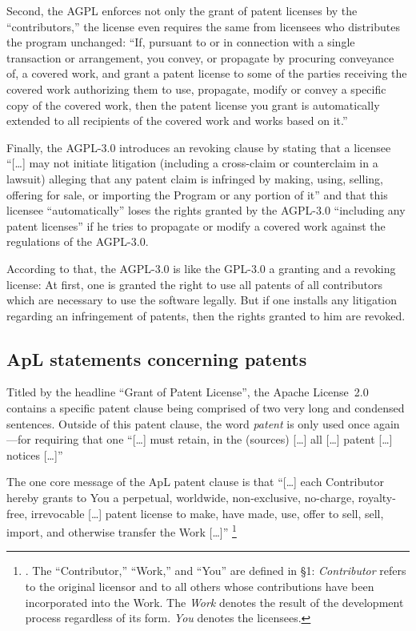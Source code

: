 Second, the AGPL enforces not only the grant of patent licenses by the
\enquote{contributors,} the license even requires the same from licensees who
distributes the program unchanged: \enquote{If, pursuant to or in connection
with a single transaction or arrangement, you convey, or propagate by procuring
conveyance of, a covered work, and grant a patent license to some of the parties
receiving the covered work authorizing them to use, propagate, modify or convey
a specific copy of the covered work, then the patent license you grant is
automatically extended to all recipients of the covered work and works based on
it.}

Finally, the AGPL-3.0 introduces an revoking clause by stating that a licensee
\enquote{[\ldots] may not initiate litigation (including a cross-claim or
counterclaim in a lawsuit) alleging that any patent claim is infringed by
making, using, selling, offering for sale, or importing the Program or any
portion of it} and that this licensee \enquote{automatically}
loses the rights granted by the AGPL-3.0 \enquote{including any patent
licenses} if he tries to propagate or modify a covered work against the
regulations of the AGPL-3.0. 

According to that, the AGPL-3.0 is like the GPL-3.0 a granting and a revoking
license: At first, one is granted the right to use all patents of all
contributors which are necessary to use the software legally. But if one
installs any litigation regarding an infringement of patents, then the rights
granted to him are revoked.


\subsection{ApL statements concerning patents}\label{subsec:ApLPatentClause}

Titled by the headline \enquote{Grant of Patent License}, the Apache License~2.0
contains a specific patent clause being comprised of two very long and condensed
sentences. Outside of this patent clause, the word \emph{patent} is
only used once again---for requiring that one \enquote{[\ldots] must retain, in
the (sources) [\ldots] all [\ldots] patent [\ldots] notices [\ldots]}

The one core message of the ApL patent clause is that
\enquote{[\ldots] each Contributor hereby grants to You a perpetual, worldwide,
non-exclusive, no-charge, royalty-free, irrevocable [\ldots] patent license to
make, have made, use, offer to sell, sell, import, and otherwise transfer the
Work [\ldots]}%
  \footnote{\cite[cf.][\nopage wp §3]{Apl20OsiLicense2004a}. The
  \enquote{Contributor,} \enquote{Work,} and \enquote{You} are defined in §1:
  \emph{Contributor} refers to the original licensor and to all others whose
  contributions have been incorporated into the Work. The \emph{Work} denotes
  the result of the development process regardless of its form. \emph{You}
  denotes the licensees.}

